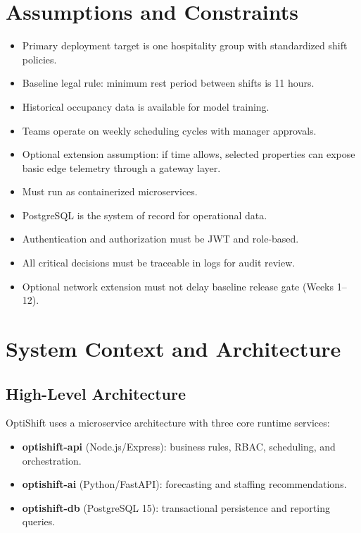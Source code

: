 \documentclass[11pt,a4paper]{article}
\begin{document}
\section{Assumptions and Constraints}
\begin{tcolorbox}[colback=SoftBg,colframe=Accent,title=Operating Assumptions]
\begin{itemize}
  \item Primary deployment target is one hospitality group with standardized shift policies.
  \item Baseline legal rule: minimum rest period between shifts is 11 hours.
  \item Historical occupancy data is available for model training.
  \item Teams operate on weekly scheduling cycles with manager approvals.
  \item Optional extension assumption: if time allows, selected properties can expose basic edge telemetry through a gateway layer.
\end{itemize}
\end{tcolorbox}

\begin{tcolorbox}[colback=SoftBg,colframe=Primary,title=Key Constraints]
\begin{itemize}
  \item Must run as containerized microservices.
  \item PostgreSQL is the system of record for operational data.
  \item Authentication and authorization must be JWT and role-based.
  \item All critical decisions must be traceable in logs for audit review.
  \item Optional network extension must not delay baseline release gate (Weeks 1--12).
\end{itemize}
\end{tcolorbox}

\section{System Context and Architecture}
\subsection{High-Level Architecture}
OptiShift uses a microservice architecture with three core runtime services:
\begin{itemize}
  \item \textbf{optishift-api} (Node.js/Express): business rules, RBAC, scheduling, and orchestration.
  \item \textbf{optishift-ai} (Python/FastAPI): forecasting and staffing recommendations.
  \item \textbf{optishift-db} (PostgreSQL 15): transactional persistence and reporting queries.
\end{itemize}
\end{document}

